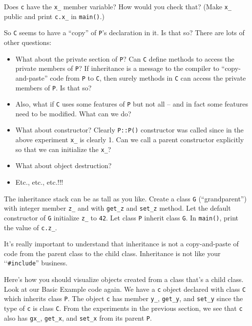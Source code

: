\begin{ex} Does \verb!c! have the \verb!x_! member variable?
How would you check that? (Make \verb!x_! public and print \verb!c.x_! in \verb!main()!.)
\end{ex}

So \verb!C! seems to have a ``copy'' of \verb!P!'s
declaration in it. Is that so? There are lots of other questions:

\begin{itemize}
\item
  What about the private section of \verb!P!? Can \verb!C! define
  methods to access the private members of \verb!P!? If inheritance is a
  message to the compiler to ``copy-and-paste'' code from \verb!P! to
  \verb!C!, then surely methods in \verb!C! can access the private
  members of \verb!P!. Is that so?
\item
  Also, what if \verb!C! uses some features of \verb!P! but not all --
  and in fact some features need to be modified. What can we do?
\item
  What about constructor? Clearly \verb!P::P()! constructor was called
  since in the above experiment \verb!x_! is clearly 1. Can we call a
  parent constructor explicitly so that we can initialize the
  \verb!x_!?
\item
  What about object destruction?
\item
  Etc., etc., etc.!!!
\end{itemize}

\begin{ex}
The inheritance stack can be as tall as you like. Create a class \verb!G! (``grandparent'') with integer member \verb!z_! and with \verb!get_z! and \verb!set_z! method. Let the default constructor of \verb!G! initialize \verb!z_! to \verb!42!. Let class \verb!P! inherit class \verb!G!. In \verb!main()!, print the value of \verb!c.z_!.
\end{ex}

\newpage{}

It's really important to understand that inheritance is not a copy-and-paste of code from the parent class to the child class. Inheritance is not like your \lq\lq \verb!#include!'' business.

Here's how you should visualize objects created from a class that's a child class. Look at our Basic Example code again. We have a \verb!c! object declared with class \verb!C! which inherits class \verb!P!. The object \verb!c! has member \verb!y_!, \verb!get_y!, and \verb!set_y! since the type of \verb!c! is class \verb!C!. From the experiments in the previous section, we see that \verb!c! also has \verb!gx_!, \verb!get_x!, and \verb!set_x! from its parent \verb!P!.

